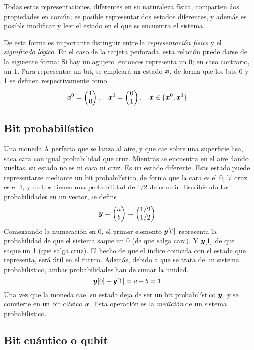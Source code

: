 Todas estas representaciones, diferentes en su naturaleza física, comparten dos 
propiedades en común; es posible representar dos estados diferentes, y además es 
posible modificar y leer el estado en el que se encuentra el sistema.

De esta forma es importante distinguir entre la \textit{representación física} y 
el \textit{significado lógico}. En el caso de la tarjeta perforada, esta 
relación puede darse de la siguiente forma: Si hay un agujero, entonces 
representa un 0; en caso contrario, un 1. Para representar un bit, se empleará 
un estado $\boldsymbol{x}$, de forma que los bits 0 y 1 se definen respectivamente como
$$ \boldsymbol{x}^0 = \begin{pmatrix} 1 \\ 0 \end{pmatrix}, \quad \boldsymbol{x}^1 = \begin{pmatrix} 0 \\ 1 \end{pmatrix}, \quad
\boldsymbol{x} \in \{\boldsymbol{x}^0, \boldsymbol{x}^1\} $$


\subsection{Bit probabilístico}

Una moneda A perfecta que se lanza al aire, y que cae sobre una superficie lisa, 
saca cara con igual probabilidad que cruz. Mientras se encuentra en el aire 
dando vueltas, su estado no es ni cara ni cruz. Es un estado diferente. Este 
estado puede representarse mediante un bit probabilístico, de forma que la cara 
es el 0, la cruz es el 1, y ambos tienen una probabilidad de 1/2 de ocurrir.  
Escribiendo las probabilidades en un vector, se define
%
$$ \boldsymbol{y} = \begin{pmatrix} a \\ b \end{pmatrix} = \begin{pmatrix} 1/2 \\ 1/2 \end{pmatrix} $$
%
Comenzando la numeración en 0, el primer elemento $\boldsymbol{y} [0]$ representa la 
probabilidad de que el sistema saque un 0 (de que salga cara). Y $\boldsymbol{y} [1]$ de 
que saque un 1 (que salga cruz). El hecho de que el índice coincida con el 
estado que representa, será útil en el futuro.
%
Además, debido a que se trata de un sistema probabilístico, ambas probabilidades 
han de sumar la unidad.
%
$$ \boldsymbol{y} [0] + \boldsymbol{y} [1] = a + b = 1 $$
%
Una vez que la moneda cae, su estado deja de ser un bit probabilístico $\boldsymbol{y}$, y 
se convierte en un bit clásico $\boldsymbol{x}$. Esta operación es la \textit{medición} de 
un sistema probabilístico.

\subsection{Bit cuántico o qubit}


